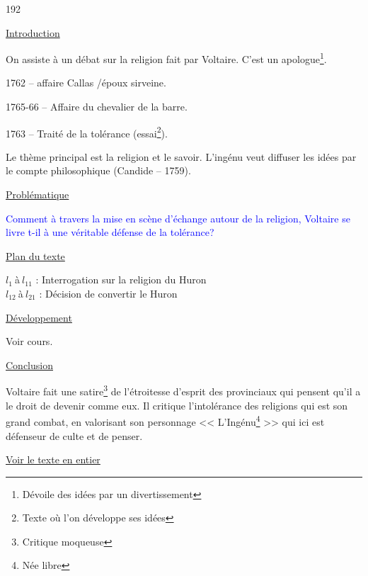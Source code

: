 \documentclass[12pt,a4paper]{article}
\begin{document}
		\begin{dingautolist}{192}

		\item \underline{Introduction} \par
			On assiste à un débat sur la religion fait par Voltaire. C'est un apologue\footnote{Dévoile des idées par un divertissement}.\par
		1762 -- affaire Callas /époux sirveine.\par
		1765-66 -- Affaire du chevalier de la barre.\par
		1763 -- Traité de la tolérance (essai\footnote{Texte où l'on développe ses idées}).\par
		Le thème principal est la religion et le savoir. L'ingénu veut diffuser les idées par le compte philosophique (Candide -- 1759).

		\item \underline{Probl\'ematique }\par
			\textcolor{blue}{Comment à travers la mise en scène d'échange autour de la religion, Voltaire se livre t-il à une véritable défense de la tolérance? }

		\item \underline{Plan du texte} \par
			$l_{1}~$\`a$~l_{11}$ : Interrogation sur la religion du Huron\\ 
			$l_{12}~$\`a$~l_{21}$ : Décision de convertir le Huron
		\item \underline{D\'eveloppement} \par
				Voir cours.

		\item \underline{Conclusion} \par
			Voltaire fait une satire\footnote{Critique moqueuse} de l'étroitesse d'esprit des provinciaux qui pensent qu'il a le droit de devenir comme eux. Il critique l'intolérance des religions qui est son grand combat, en valorisant son personnage << L'Ingénu\footnote{Née libre} >> qui ici est défenseur de culte et de penser. 




		\end{dingautolist}
\href{.extra/Textes/Voltaire_Ingénu_Texte1.pdf}{Voir le texte en entier}
		 \newpage
\end{document}
